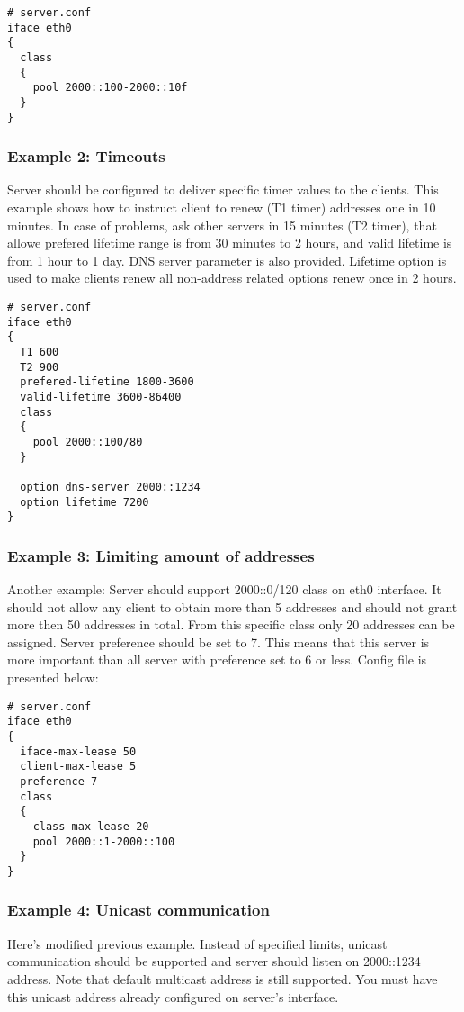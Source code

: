 \begin{verbatim}
# server.conf
iface eth0
{ 
  class
  {
    pool 2000::100-2000::10f
  } 
}
\end{verbatim}

\subsubsection{Example 2: Timeouts}
Server should be configured to deliver specific timer values to the
clients. This example shows how to instruct client to renew (T1 timer) 
addresses one in 10 minutes. In case of problems, ask other servers in
15 minutes (T2 timer), that allowe prefered lifetime range is from 30
minutes to 2 hours, and valid lifetime is from 1 hour to 1 day. DNS
server parameter is also provided. Lifetime option is used to make
clients renew all non-address related options renew once in 2 hours.

\begin{verbatim}
# server.conf
iface eth0 
{
  T1 600
  T2 900
  prefered-lifetime 1800-3600
  valid-lifetime 3600-86400
  class
  {
    pool 2000::100/80
  } 

  option dns-server 2000::1234
  option lifetime 7200
}
\end{verbatim}

\subsubsection{Example 3: Limiting amount of addresses}
Another example: Server should support 2000::0/120 class on eth0
interface. It should not allow any client to obtain more than 5
addresses and should not grant more then 50 addresses in total. From
this specific class only 20 addresses can be assigned. Server
preference should be set to 7. This means that this server is more
important than all server with preference set to 6 or less. 
Config file is presented below:

\begin{verbatim}
# server.conf
iface eth0
{
  iface-max-lease 50
  client-max-lease 5
  preference 7
  class
  {
    class-max-lease 20
    pool 2000::1-2000::100
  }
}  
\end{verbatim}

\subsubsection{Example 4: Unicast communication}
Here's modified previous example. Instead of specified limits, unicast
communication should be supported and server should listen on
2000::1234 address. Note that default multicast address is still
supported. You must have this unicast address already configured on 
server's interface.

